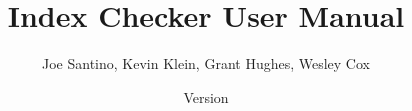 \documentclass[10pt]{report}
\title{Index Checker User Manual}
\author{Joe Santino, Kevin Klein, Grant Hughes, Wesley Cox}
\date{Version \IndexReleaseInfo{}}
\begin{document}

{\let\newpage\relax \maketitle}



\tableofcontents
\newpage



\htmlhr
%
%
\end{document}
